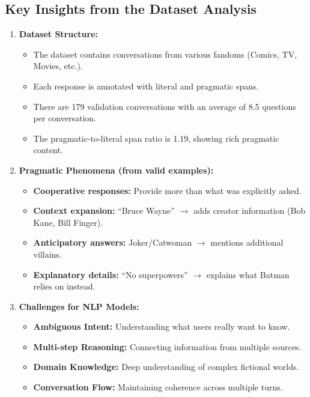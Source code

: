 \documentclass[12pt, letterpaper]{article}
\begin{document}
\subsection*{Key Insights from the Dataset Analysis}
\begin{enumerate}
    \item \textbf{Dataset Structure:}
    \begin{itemize}
        \item The dataset contains conversations from various fandoms (Comics, TV, Movies, etc.).
        \item Each response is annotated with literal and pragmatic spans.
        \item There are 179 validation conversations with an average of 8.5 questions per conversation.
        \item The pragmatic-to-literal span ratio is 1.19, showing rich pragmatic content.
    \end{itemize}

    \item \textbf{Pragmatic Phenomena (from valid examples):}
    \begin{itemize}
        \item \textbf{Cooperative responses:} Provide more than what was explicitly asked.
        \item \textbf{Context expansion:} ``Bruce Wayne'' $\rightarrow$ adds creator information (Bob Kane, Bill Finger).
        \item \textbf{Anticipatory answers:} Joker/Catwoman $\rightarrow$ mentions additional villains.
        \item \textbf{Explanatory details:} ``No superpowers'' $\rightarrow$ explains what Batman relies on instead.
    \end{itemize}

    \item \textbf{Challenges for NLP Models:}
    \begin{itemize}
        \item \textbf{Ambiguous Intent:} Understanding what users really want to know.
        \item \textbf{Multi-step Reasoning:} Connecting information from multiple sources.
        \item \textbf{Domain Knowledge:} Deep understanding of complex fictional worlds.
        \item \textbf{Conversation Flow:} Maintaining coherence across multiple turns.
    \end{itemize}


\end{enumerate}
\end{document}
